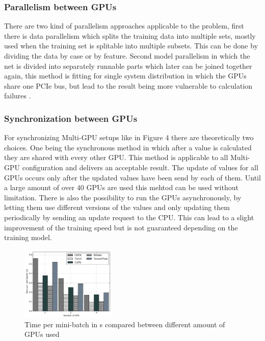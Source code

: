 \documentclass[conference]{IEEEtran}
\begin{document}
\subsubsection{Parallelism between GPUs}
There are two kind of parallelism approaches applicable to the problem, first there is data parallelism which splits the training data into multiple sets, mostly used when the training set is splitable into multiple subsets. This can be done by dividing the data by case or by feature. Second model parallelism in which the net is divided into separately runnable parts which later can be joined together again, this method is fitting for single system distribution in which the GPUs share one PCIe bus, but lead to the result being more vulnerable to calculation failures \cite{sastre2017scalability}.

\subsubsection{Synchronization between GPUs}
For synchronizing Multi-GPU setups like in Figure 4 there are theoretically two choices. One being the synchronous method in which after a value is calculated they are shared with every other GPU. This method is applicable to all Multi-GPU configuration and delivers an acceptable result\cite{wang2016deep}. The update of values for all GPUs occurs only after the updated values have been send by each of them. Until a large amount of over 40 GPUs are used this mehtod can be used without limitation\cite{sastre2017scalability}. 
There is also the possibility to run the GPUs asynchronously, by letting them use different versions of the values and only updating them periodically by sending an update request to the CPU. This can lead to a slight improvement of the training speed but is not guaranteed depending on the training model\cite{wang2016deep}.


\begin{figure}
\centering
\includegraphics[width=0.4\textwidth]{a.png}

\caption{Time per mini-batch in s compared between different amount of GPUs used\cite{shi2016benchmarking}}
\label{fig_m_gpu}
\end{figure}
\end{document}
